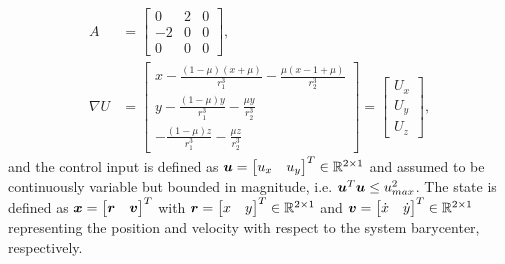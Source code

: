 \documentclass[smallcondensed]{svjour3}
\begin{document}
\begin{align}
    A &= \left[ \begin{array}{ccc} 0 & 2 & 0 \\ -2 & 0 & 0 \\ 0 & 0 & 0 \end{array} \right], \label{eq:A_mat} \\
    \nabla U &= \left[ \begin{array}{c} x - \frac{ \left(1 - \mu\right) \left(x + \mu\right)}{r_1^3} - \frac{\mu \left( x - 1 + \mu \right)}{r_2^3} \\
                                                                                        y - \frac{ \left(1 - \mu\right) y}{r_1^3} - \frac{\mu y}{r_2^3} \\
                                                                                        - \frac{ \left(1 - \mu\right) z}{r_1^3} - \frac{\mu z}{r_2^3}\end{array}\right]
                                        = \left[\begin{array}{c} U_x \\ U_y \\ U_z\end{array} \right] , \label{eq:grav_pot}
\end{align}
and the control input is defined as \( \bm{u} = \begin{bmatrix} u_x & u_y \end{bmatrix}^T \in \mathbb{R}^{2\times1} \) and assumed to be continuously variable but bounded in magnitude, i.e. \( \bm{u}^T \bm{u} \leq u_{max}^2 \).
The state is defined as \( \bm{x} = \begin{bmatrix}\bm{r} &\bm{v} \end{bmatrix}^T\) with \(\bm{r} = \begin{bmatrix} x & y \end{bmatrix}^T \in \mathbb{R}^{2\times1}\) and \(\bm{v}= \begin{bmatrix} \dot{x} & \dot{y} \end{bmatrix}^T \in \mathbb{R}^{2\times1}\) representing the position and velocity with respect to the system barycenter, respectively.
\end{document}
